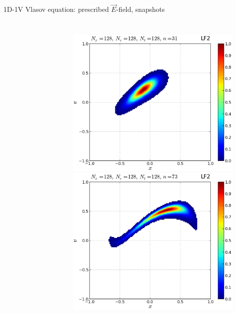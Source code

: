 \documentclass{beamer}
\begin{document}
\begin{frame}{1D-1V Vlasov equation: prescribed $\vec{E}$-field, snapshots}
\begin{columns}
\begin{figure}
\end{figure}
\begin{figure}
\centering
 \includegraphics[width=\textwidth]{graphics/plot_-_1DVP_F12_Nx128Nv128Nt128_it00031}\\ \vspace*{-4mm}
 \includegraphics[width=\textwidth]{graphics/plot_-_1DVP_F12_Nx128Nv128Nt128_it00073}
\end{figure}
 \end{columns}


\end{frame}
\end{document}
